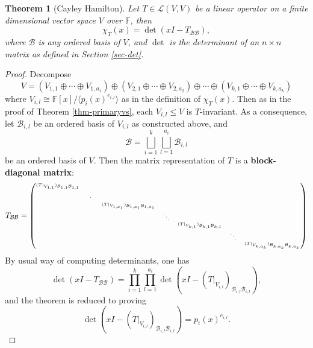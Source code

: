 \documentclass[11pt,openany]{book}
\theoremstyle{plain}
\newtheorem{theorem}{Theorem}[chapter]
\theoremstyle{definition}
\theoremstyle{remark}
\begin{document}
\begin{theorem}[Cayley Hamilton]
    Let $T \in \mathcal{L}(V,V)$ be a linear operator on a finite dimensional vector space $V$ over $\mathbb{F}$, then
    $$\chi_T(x) = \det(xI -T_{\mathcal{B}\mathcal{B}}),$$
    where $\mathcal{B}$ is any ordered basis of $V$, and $\det$ is the determinant of an $n \times n$ matrix as defined in Section \ref{sec-det}. 
\end{theorem}

\begin{proof}
 Decompose
$$V= (V_{1,1} \oplus \cdots \oplus V_{1,a_1}) \oplus 
(V_{2,1} \oplus \cdots \oplus V_{2,a_2}) \oplus \cdots \oplus 
(V_{k,1} \oplus \cdots \oplus V_{k,a_k})$$
where $V_{i,l} \cong \mathbb{F}[x]/\langle p_i(x)^{e_{i,l}} \rangle$ as in the definition of $\chi_{T}(x)$. Then as in the proof of Theorem \ref{thm-primaryvs}, each $V_{i,l} \leq V$ is $T$-invariant. As a consequence, let $\mathcal{B}_{i,l}$ be an ordered basis of $V_{i,l}$ as constructed above, and
$$\mathcal{B} = \bigsqcup_{i=1}^k \bigsqcup_{l = 1}^{a_i} \mathcal{B}_{i,l}$$
be an ordered basis of $V$. Then the matrix representation of $T$ is a {\bf block-diagonal matrix}:
$$T_{\mathcal{B}\mathcal{B}} = \tiny{\begin{pmatrix} (T|_{V_{1,1}})_{\mathcal{B}_{1,1}\mathcal{B}_{1,1}} & & & & & \\
& \ddots & & & & & \\ 
& & (T|_{V_{1,a_1}})_{\mathcal{B}_{1,a_1}\mathcal{B}_{1,a_1}} & & & & \\
& & & \ddots & & &\\
& & & & (T|_{V_{k,1}})_{\mathcal{B}_{k,1}\mathcal{B}_{k,1}} & & \\
& & & & & \ddots & \\
& & & & & & (T|_{V_{k,a_k}})_{\mathcal{B}_{k,a_k}\mathcal{B}_{k,a_k}}\end{pmatrix}}
$$
By usual way of computing determinants, one has
$$\det(xI-T_{\mathcal{B}\mathcal{B}}) = \prod_{i = 1}^k \prod_{l = 1}^{a_i} \det(xI - (T|_{V_{i,l}})_{\mathcal{B}_{i,l}\mathcal{B}_{i,l}}),$$
and the theorem is reduced to proving
$$\det(xI - (T|_{V_{i,l}})_{\mathcal{B}_{i,l}\mathcal{B}_{i,l}}) = p_i(x)^{e_{i,l}}.$$


\end{proof}
\end{document}
